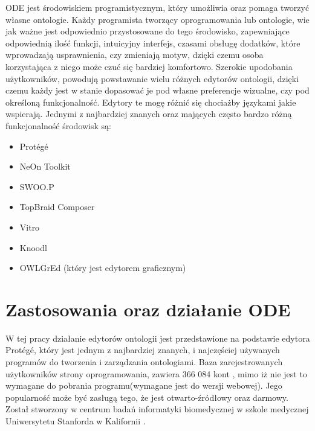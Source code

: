 \documentclass[a4paper,12pt, twoside]{book} %
\begin{document}
ODE jest środowiskiem programistycznym, który umożliwia oraz pomaga tworzyć własne ontologie. Każdy programista tworzący oprogramowania lub ontologie, wie jak ważne jest odpowiednio przystosowane do tego środowisko, zapewniające odpowiednią ilość funkcji, intuicyjny interfejs, czasami obsługę dodatków, które wprowadzają usprawnienia, czy zmieniają motyw, dzięki czemu osoba korzystająca z niego może czuć się bardziej komfortowo. Szerokie upodobania użytkowników, powodują powstawanie wielu różnych edytorów ontologii, dzięki czemu każdy jest w stanie dopasować je pod własne preferencje wizualne, czy pod określoną funkcjonalność. Edytory te mogę różnić się chociażby językami jakie wspierają.
Jednymi z najbardziej znanych oraz mających często bardzo różną funkcjonalność środowisk są:
\begin{itemize}
	\item Protégé
	\item NeOn Toolkit
	\item SWOO.P
	\item TopBraid Composer
	\item Vitro
	\item Knoodl
	\item OWLGrEd (który jest edytorem graficznym)
\end{itemize}

\section{Zastosowania oraz działanie ODE}

W tej pracy działanie edytorów ontologii jest przedstawione na podstawie edytora Protégé, który jest jednym z najbardziej znanych, i najczęściej używanych programów do tworzenia i zarządzania ontologiami. Baza zarejestrowanych użytkowników strony oprogramowania, zawiera 366 084 kont \cite{protegecli}, mimo iż nie jest to wymagane do pobrania programu(wymagane jest do wersji webowej). Jego popularność może być zasługą tego, że jest otwarto-źródłowy oraz darmowy. Został stworzony w centrum badań informatyki biomedycznej w szkole medycznej Uniwersytetu Stanforda w Kalifornii \cite{protegeabout}.
\end{document}
